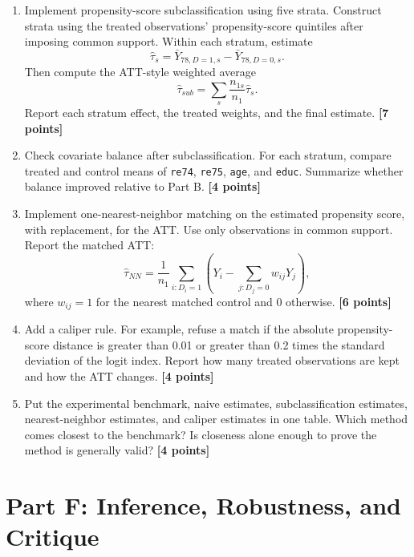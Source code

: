 \documentclass[11pt]{article}
\newcommand{\points}[1]{\hfill \textbf{[#1 points]}}
\begin{document}
\begin{enumerate}[label=E\arabic*.]
  \item Implement propensity-score subclassification using five strata. Construct strata using the treated observations' propensity-score quintiles after imposing common support. Within each stratum, estimate
  \[
    \widehat{\tau}_s
    =
    \bar{Y}_{78,D=1,s}
    -
    \bar{Y}_{78,D=0,s}.
  \]
  Then compute the ATT-style weighted average
  \[
    \widehat{\tau}_{sub}
    =
    \sum_s
    \frac{n_{1s}}{n_1}
    \widehat{\tau}_s.
  \]
  Report each stratum effect, the treated weights, and the final estimate. \points{7}

  \item Check covariate balance after subclassification. For each stratum, compare treated and control means of \texttt{re74}, \texttt{re75}, \texttt{age}, and \texttt{educ}. Summarize whether balance improved relative to Part B. \points{4}

  \item Implement one-nearest-neighbor matching on the estimated propensity score, with replacement, for the ATT. Use only observations in common support. Report the matched ATT:
  \[
    \widehat{\tau}_{NN}
    =
    \frac{1}{n_1}\sum_{i:D_i=1}
    \left(Y_i-\sum_{j:D_j=0}w_{ij}Y_j\right),
  \]
  where \(w_{ij}=1\) for the nearest matched control and 0 otherwise. \points{6}

  \item Add a caliper rule. For example, refuse a match if the absolute propensity-score distance is greater than 0.01 or greater than 0.2 times the standard deviation of the logit index. Report how many treated observations are kept and how the ATT changes. \points{4}

  \item Put the experimental benchmark, naive estimates, subclassification estimates, nearest-neighbor estimates, and caliper estimates in one table. Which method comes closest to the benchmark? Is closeness alone enough to prove the method is generally valid? \points{4}
\end{enumerate}

\section*{Part F: Inference, Robustness, and Critique}
\end{document}
